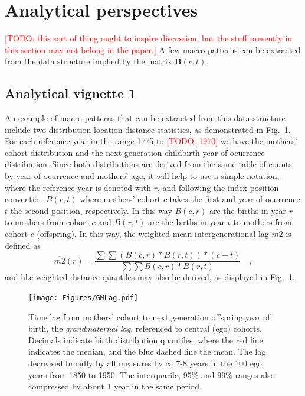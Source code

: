 \documentclass{article}
\newcommand\todo[1]{\textcolor{red}{[TODO: #1]}}
\begin{document}
\section{Analytical perspectives}
\todo{this sort of thing ought to inspire discussion, but the stuff presently in this section may not belong in the paper.}
A few macro patterns can be extracted from the data structure implied by the matrix $\mathbf{B}(c,t)$. 

\subsection{Analytical vignette 1}
An example of macro patterns that can be extracted from this data structure include two-distribution location distance statistics, as demonstrated in Fig.~\ref{fig:gmlag}. For each reference year in the range 1775 to \todo{1970} we have the mothers' cohort distribution and the next-generation childbirth year of ocurrence distribution. Since both distributions are derived from the same table of counts by year of ocurrence and mothers' age, it will help to use a simple notation, where the reference year is denoted with $r$, and following the index position convention $B(c,t)$ where mothers' cohort $c$ takes the first and year of ocurrence $t$ the second position, respectively. In this way $B(c,r)$ are the births in year $r$ to mothers from cohort $c$ and $B(r,t)$ are the births in year $t$ to mothers from cohort $c$ (offspring). In this way, the weighted mean intergenerational lag $\overline{m2}$ is defined as
\begin{equation}
\overline{m2}(r) = \frac{\sum\sum (B(c,r)*B(r,t)) * (c - t)}{\sum\sum B(c,r)*B(r,t)} \quad \mathrm{,}
\end{equation}
and like-weighted distance quantiles may also be derived, as displayed in Fig.~\ref{fig:gmlag}.

\begin{figure}
\texttt{[image: Figures/GMLag.pdf]}
\caption{Time lag from mothers' cohort to next generation offspring year of birth, the \emph{grandmaternal lag}, referenced to central (ego) cohorts. Decimals indicate birth distribution quantiles, where the red line indicates the median, and the blue dashed line the mean. The lag decreased broadly by all measures by ca 7-8 years in the 100 ego years from 1850 to 1950. The interquarile, 95\% and 99\% ranges also compressed by about 1 year in the same period.}
\label{fig:gmlag}
\end{figure}
\end{document}
